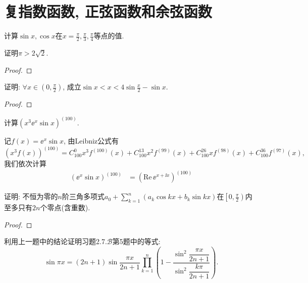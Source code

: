 \section{复指数函数, 正弦函数和余弦函数}
\begin{quiza}
\woe 计算\(\sin x,\cos x\)在\(x=\frac{\pi}{2},\frac{\pi}{3},\frac{\pi}{4}\)等点的值.
\begin{solution}

\end{solution}
\woe 证明\(\pi>2\sqrt{2}\). 
\begin{proof}

\end{proof}
\woe 证明: \(\forall x\in\left(0,\frac{\pi}{2}\right)\), 成立\(\sin x<x<4\sin\frac{x}{2}-\sin x\).
\begin{proof}

\end{proof}
\woe 计算\(\left(x^3\ee^{x}\sin x\right)^{(100)}\).
\begin{solution}
记\(f(x)=\ee^x\sin x\), 由Leibniz公式有\[\left(x^3f(x)\right)^{(100)}=C_{100}^0x^3f^{(100)}(x)+C_{100}^13x^2f^{(99)}(x)+C_{100}^26xf^{(98)}(x)+C_{100}^36f^{(97)}(x),\]我们依次计算\[\begin{split}
\left(\ee^x\sin x\right)^{(100)}&=\left(\mathrm{Re}\,\ee^{x+\ii x}\right)^{(100)}
\end{split}\]
\end{solution}
\woe 证明: 不恒为零的\(n\)阶三角多项式\(a_0+\sum_{k=1}^{n}(a_k\cos kx+b_k\sin kx)\)在\(\left[0,\frac{\pi}{2}\right)\)内至多只有\(2n\)个零点(含重数).
\begin{proof}

\end{proof}
\woe 利用上一题中的结论证明习题2.7.\(\boldsymbol{\mathcal{B}}\)第5题中的等式:\[\sin \pi x=(2n+1)\sin\frac{\pi x}{2n+1}\prod_{k=1}^{n}\left(1-\frac{\sin^2\dfrac{\pi x}{2n+1}}{\sin^2\dfrac{k\pi}{2n+1}}\right).\]
\end{quiza}
